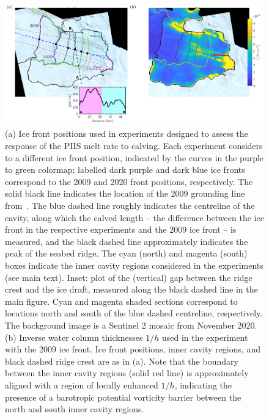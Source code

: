\documentclass[draft]{agujournal2019}
\begin{document}
\begin{figure}
    \centering
    \includegraphics[width =\textwidth]{plots/figure10.pdf}
    \caption{(a) Ice front positions used in experiments designed to assess the response of the PIIS melt rate to calving. Each experiment considers to a different ice front position, indicated by the curves in the purple to green colormap; labelled dark purple and dark blue ice fronts correspond to the 2009 and 2020 front positions, respectively. The solid black line indicates the location of the 2009 grounding line from~. The blue dashed line roughly indicates the centreline of the cavity, along which the calved length -- the difference between the ice front in the respective experiments and the 2009 ice front -- is measured, and the black dashed line approximately indicates the peak of the seabed ridge. The cyan (north) and magenta (south) boxes indicate the inner cavity regions considered in the experiments (see main text). Inset: plot of the (vertical) gap between the ridge crest and the ice draft, measured along the black dashed line in the main figure. Cyan and magenta shaded sections correspond to locations north and south of the blue dashed centreline, respectively. The background image is a Sentinel 2 mosaic from November 2020. (b) Inverse water column thicknesses $1/h$ used in the experiment with the 2009 ice front. Ice front positions, inner cavity regions, and black dashed ridge crest are as in (a).  Note that the boundary between the inner cavity regions (solid red line) is approximately aligned with a region of locally enhanced $1/h$, indicating the presence of a barotropic potential vorticity barrier between the north and south inner cavity regions.}
    \label{fig:figure10}
\end{figure}

\end{document}
